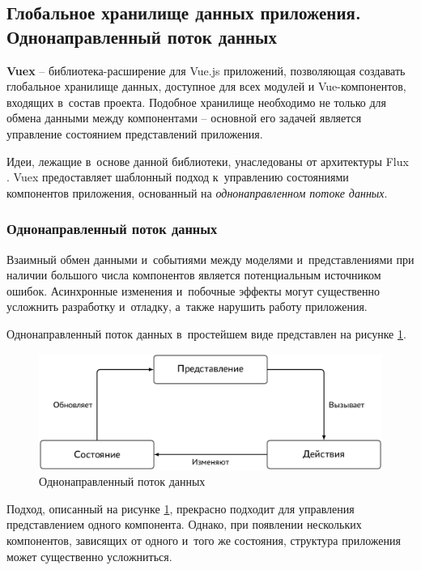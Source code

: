 \subsection{Глобальное хранилище данных приложения. Однонаправленный поток данных}

\textbf{Vuex} -- библиотека-расширение для Vue.js приложений, позволяющая создавать глобальное хранилище данных, доступное для всех модулей и Vue-компонентов, входящих в~состав проекта. Подобное хранилище необходимо не только для обмена данными между компонентами -- основной его задачей является управление состоянием представлений приложения.

Идеи, лежащие в~основе данной библиотеки, унаследованы от архитектуры Flux \cite{Flux}. Vuex предоставляет шаблонный подход к~управлению состояниями компонентов приложения, основанный на \emph{однонаправленном потоке данных}.


\subsubsection{Однонаправленный поток данных}

Взаимный обмен данными и~событиями между моделями и~представлениями при наличии большого числа компонентов является потенциальным источником ошибок. Асинхронные изменения и~побочные эффекты могут существенно усложнить разработку и~отладку, а~также нарушить работу приложения.

Однонаправленный поток данных в~простейшем виде представлен на рисунке \ref{fig:simple-oneway-data-flow}.

\begin{figure}[h!]
  \centering
  \setlength{\fboxsep}{5pt}
  \includegraphics[width=.9\textwidth]{img/tikz/simple-oneway-data-flow/pic}
  \vspace*{12pt}
  \caption{Однонаправленный поток данных}\label{fig:simple-oneway-data-flow}
\end{figure}

Подход, описанный на рисунке \ref{fig:simple-oneway-data-flow}, прекрасно подходит для управления представлением одного компонента. Однако, при появлении нескольких компонентов, зависящих от одного и~того же состояния, структура приложения может существенно усложниться.

